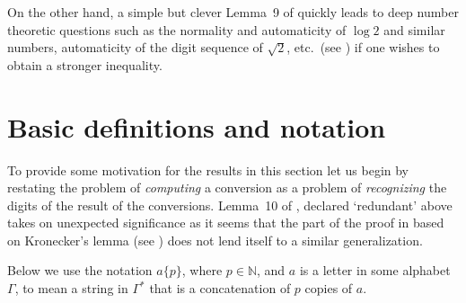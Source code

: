 \documentclass[12pt]{article}
\begin{document}
On the other hand, a simple but clever Lemma~9 of \cite{Clinger}
quickly leads to deep number theoretic questions such as the normality
and automaticity of $\log 2$ and similar numbers, automaticity of the digit sequence
of $\sqrt 2$, etc.\ (see \cite{Allouche}) if one wishes to obtain a
stronger inequality.
 
\section{Basic definitions and notation}\label{autom}
To provide some motivation for the results in this section let us begin
by restating the problem of {\it 
  computing\/} a conversion as a problem of {\it recognizing\/} the
digits of the result of the conversions. Lemma~10 of \cite{Clinger},
declared `redundant' above takes on unexpected significance as it
seems that the part of the proof in \cite{Clinger} based on
Kronecker's lemma (see \cite{Hardy}) does not lend itself to a similar
generalization. 

Below we use the notation $a\{p\}$, where $p\in \mathbb N$, and $a$ is a
letter in some alphabet $\Gamma$, to mean a string in $\Gamma^*$ that
is a concatenation of $p$ copies of $a$.

\iffalse
Given the `input radix' {\tt D}, the `output radix' {\tt d}, and the
`exponent radix' $\ttb$, consider the following language $P=\{\,
{\tt 10}\{p\}\mid p\in {\mathbb N}\,\}$ where {\tt 1} and {\tt 0} are
$\ttb$-digits. This language can be partitioned into $P_d$, $d<{\tt
  d}$, where 
$$
P_d=\{\,{\tt 10}\{p\}\mid d\cdot {\tt d}^k\hbox{ is the
best one-digit approximation of ${\tt D}^{\ttb^p}$}\,\}
$$
We again assume ${\tt d}>2$ for simplicity. It is easy to see that if
one of $P_d$ is not a regular language, then the sequence $S_n({\tt D},
{\tt d})$ above is not $\ttb$-automatic thus proving that radix
conversions cannot be computed using finite automata. For some
combinations of $\ttb$ and {\tt d} we have the following stronger statement:
\begin{lemma}\label{cling}Provided $\ttb^2/(\ttb-1)<2{\tt
    d}^{n-1}\log{\tt d}$, some of $P_d$ are not context-free.
\end{lemma}
\begin{proof}Suppose $P_d$ is context free for each $d<{\tt d}$. Then,
  the standard pumping lemma for CFL's (see \cite{hum}) implies that for
  each such $d$ there
  exist $p,q\in \mathbb N$ such that for any $k\in\mathbb N$ ${\tt
    10}\{p+kq\}\in P_d$. Putting $Q$ to be the product of all $q$'s
  we conclude that for a large enough $p$, if ${\tt 10}\{p\}\in P_d$
  then so is ${\tt 10}\{p+Q\}$. Using Lemma~9 of \cite{Clinger} there
  is an arbitrarily large $k\in\mathbb N$ such that
$$
{\frac{\ttb-1}{\ttb^2}}<(\ttb^k(\ttb^{p+Q}-\ttb^p)\log_{\tt
  d}{\tt D})<{\frac{\ttb^2-\ttb+1}{\ttb^2}}
$$
The same argument as that of Lemma~10 of \cite{Clinger} shows that
this contradicts ${\tt 10}\{p+k\}$ and ${\tt 10}\{p+k+Q\}$ both being
in $P_d$.
\end{proof}
\fi
\end{document}
